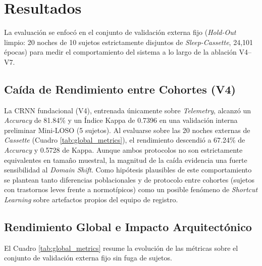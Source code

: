 \documentclass[conference]{IEEEtran}
\begin{document}
\section{Resultados}

La evaluación se enfocó en el conjunto de validación externa fijo (\textit{Hold-Out} limpio: 20 noches de 10 sujetos estrictamente disjuntos de \textit{Sleep-Cassette}, 24,101 épocas) para medir el comportamiento del sistema a lo largo de la ablación V4--V7.

\subsection{Caída de Rendimiento entre Cohortes (V4)}
La CRNN fundacional (V4), entrenada únicamente sobre \textit{Telemetry}, alcanzó un \textit{Accuracy} de 81.84\% y un Índice Kappa de 0.7396 en una validación interna preliminar Mini-LOSO (5 sujetos). Al evaluarse sobre las 20 noches externas de \textit{Cassette} (Cuadro \ref{tab:global_metrics}), el rendimiento descendió a 67.24\% de \textit{Accuracy} y 0.5728 de Kappa. Aunque ambos protocolos no son estrictamente equivalentes en tamaño muestral, la magnitud de la caída evidencia una fuerte sensibilidad al \textit{Domain Shift}. Como hipótesis plausibles de este comportamiento se plantean tanto diferencias poblacionales y de protocolo entre cohortes (sujetos con trastornos leves frente a normotípicos) como un posible fenómeno de \textit{Shortcut Learning} \cite{geirhos2020shortcut} sobre artefactos propios del equipo de registro.

\subsection{Rendimiento Global e Impacto Arquitectónico}
El Cuadro \ref{tab:global_metrics} resume la evolución de las métricas sobre el conjunto de validación externa fijo sin fuga de sujetos.
\end{document}
